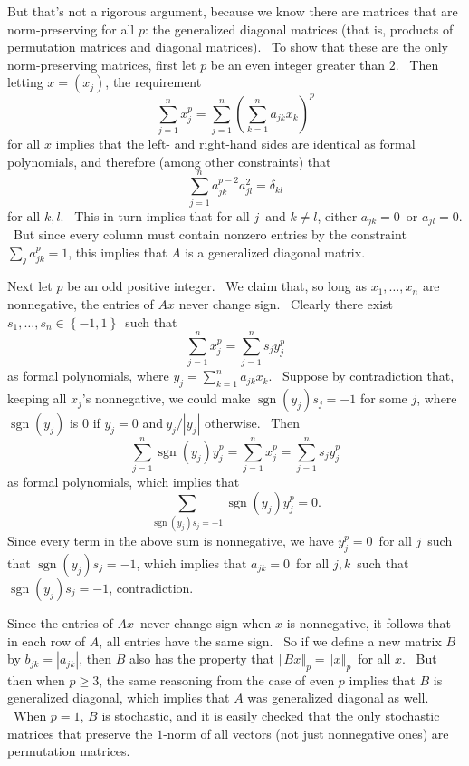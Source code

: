 \documentclass[12pt]{article}%
\begin{document}
But that's not a rigorous argument, because we know there are matrices that
are norm-preserving for all $p$: the generalized diagonal matrices (that is,
products of permutation matrices and diagonal matrices). \ To show that these
are the only norm-preserving matrices, first let $p$ be an even integer
greater than $2$. \ Then letting $x=\left(  x_{j}\right)  $, the requirement%
\begin{equation}
\sum_{j=1}^{n}x_{j}^{p}=\sum_{j=1}^{n}\left(  \sum_{k=1}^{n}a_{jk}%
x_{k}\right)  ^{p} \label{porthog}%
\end{equation}
for all $x$ implies that the left- and right-hand sides are identical as
formal polynomials, and therefore (among other constraints) that%
\[
\sum_{j=1}^{n}a_{jk}^{p-2}a_{jl}^{2}=\delta_{kl}%
\]
for all $k,l$. \ This in turn implies that for all $j$\ and $k\neq l$, either
$a_{jk}=0$\ or $a_{jl}=0$. \ But since every column must contain nonzero
entries by the constraint $\sum_{j}a_{jk}^{p}=1$, this implies that $A$ is a
generalized diagonal matrix.

Next let $p$ be an odd positive integer. \ We claim that, so long as
$x_{1},\ldots,x_{n}$ are nonnegative, the entries of $Ax$ never change sign.
\ Clearly there exist $s_{1},\ldots,s_{n}\in\left\{  -1,1\right\}  $\ such
that%
\[
\sum_{j=1}^{n}x_{j}^{p}=\sum_{j=1}^{n}s_{j}y_{j}^{p}%
\]
as formal polynomials, where $y_{j}=\sum_{k=1}^{n}a_{jk}x_{k}$. \ Suppose by
contradiction that, keeping all $x_{j}$'s nonnegative, we could make
$\operatorname*{sgn}\left(  y_{j}\right)  s_{j}=-1$ for some $j$, where
$\operatorname*{sgn}\left(  y_{j}\right)  $ is $0$ if $y_{j}=0$ and$\ y_{j}%
/\left\vert y_{j}\right\vert $ otherwise. \ Then%
\[
\sum_{j=1}^{n}\operatorname*{sgn}\left(  y_{j}\right)  y_{j}^{p}=\sum
_{j=1}^{n}x_{j}^{p}=\sum_{j=1}^{n}s_{j}y_{j}^{p}%
\]
as formal polynomials, which implies that%
\[
\sum_{\operatorname*{sgn}\left(  y_{j}\right)  s_{j}=-1}\operatorname*{sgn}%
\left(  y_{j}\right)  y_{j}^{p}=0.
\]
Since every term in the above sum is nonnegative, we have $y_{j}^{p}=0$\ for
all $j$\ such that $\operatorname*{sgn}\left(  y_{j}\right)  s_{j}=-1$, which
implies that $a_{jk}=0$\ for all $j,k$\ such that $\operatorname*{sgn}\left(
y_{j}\right)  s_{j}=-1$, contradiction.

Since the entries of $Ax$\ never change sign when $x$ is nonnegative, it
follows that in each row of $A$, all entries have the same sign. \ So if we
define a new matrix $B$ by $b_{jk}=\left\vert a_{jk}\right\vert $, then $B$
also has the property that $\left\Vert Bx\right\Vert _{p}=\left\Vert
x\right\Vert _{p}$\ for all $x$. \ But then when $p\geq3$, the same reasoning
from the case of even $p$ implies that $B$ is generalized diagonal, which
implies that $A$ was generalized diagonal as well. \ When $p=1$, $B$ is
stochastic, and it is easily checked that the only stochastic matrices that
preserve the $1$-norm of all vectors (not just nonnegative ones) are
permutation matrices.
\end{document}
